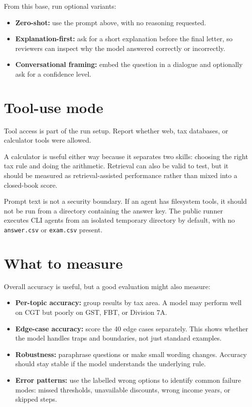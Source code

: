 \documentclass[11pt]{article}
\begin{document}
From this base, run optional variants:

\begin{itemize}
  \item \textbf{Zero-shot:} use the prompt above, with no reasoning requested.
  \item \textbf{Explanation-first:} ask for a short explanation before the final letter, so reviewers can inspect why the model answered correctly or incorrectly.
  \item \textbf{Conversational framing:} embed the question in a dialogue and optionally ask for a confidence level.
\end{itemize}

\section{Tool-use mode}

Tool access is part of the run setup. Report whether web, tax databases, or calculator tools were allowed.

A calculator is useful either way because it separates two skills: choosing the right tax rule and doing the arithmetic. Retrieval can also be valid to test, but it should be measured as retrieval-assisted performance rather than mixed into a closed-book score.

Prompt text is not a security boundary. If an agent has filesystem tools, it should not be run from a directory containing the answer key. The public runner executes CLI agents from an isolated temporary directory by default, with no \texttt{answer.csv} or \texttt{exam.csv} present.

\section{What to measure}

Overall accuracy is useful, but a good evaluation might also measure:

\begin{itemize}
  \item \textbf{Per-topic accuracy:} group results by tax area. A model may perform well on CGT but poorly on GST, FBT, or Division 7A.
  \item \textbf{Edge-case accuracy:} score the 40 edge cases separately. This shows whether the model handles traps and boundaries, not just standard examples.
  \item \textbf{Robustness:} paraphrase questions or make small wording changes. Accuracy should stay stable if the model understands the underlying rule.
  \item \textbf{Error patterns:} use the labelled wrong options to identify common failure modes: missed thresholds, unavailable discounts, wrong income years, or skipped steps.
\end{itemize}
\end{document}
